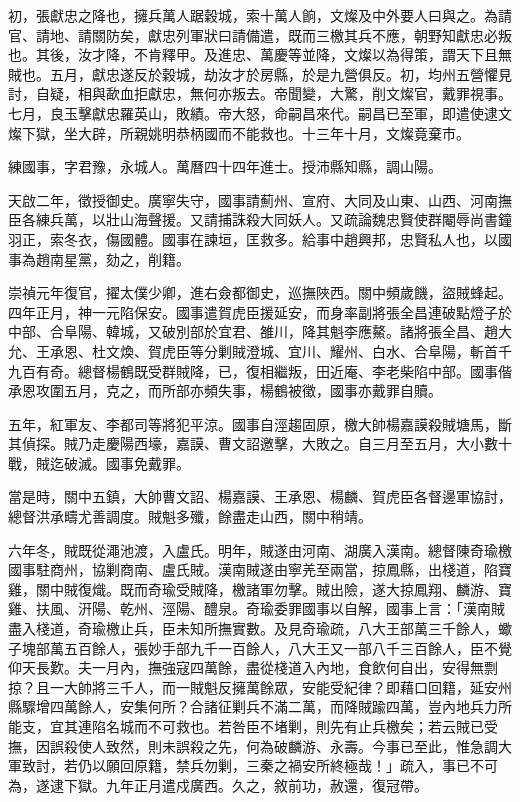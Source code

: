 \begin{pinyinscope}
初，張獻忠之降也，擁兵萬人踞穀城，索十萬人餉，文燦及中外要人曰與之。為請官、請地、請關防矣，獻忠列軍狀曰請備遣，既而三檄其兵不應，朝野知獻忠必叛也。其後，汝才降，不肯釋甲。及進忠、萬慶等並降，文燦以為得策，謂天下且無賊也。五月，獻忠遂反於穀城，劫汝才於房縣，於是九營俱反。初，均州五營懼見討，自疑，相與歃血拒獻忠，無何亦叛去。帝聞變，大驚，削文燦官，戴罪視事。七月，良玉擊獻忠羅英山，敗績。帝大怒，命嗣昌來代。嗣昌已至軍，即遣使逮文燦下獄，坐大辟，所親姚明恭柄國而不能救也。十三年十月，文燦竟棄市。

練國事，字君豫，永城人。萬曆四十四年進士。授沛縣知縣，調山陽。

天啟二年，徵授御史。廣寧失守，國事請薊州、宣府、大同及山東、山西、河南撫臣各練兵萬，以壯山海聲援。又請捕誅殺大同妖人。又疏論魏忠賢使群閹辱尚書鐘羽正，索冬衣，傷國體。國事在諫垣，匡救多。給事中趙興邦，忠賢私人也，以國事為趙南星黨，劾之，削籍。

崇禎元年復官，擢太僕少卿，進右僉都御史，巡撫陜西。關中頻歲饑，盜賊蜂起。四年正月，神一元陷保安。國事遣賀虎臣援延安，而身率副將張全昌連破點燈子於中部、合阜陽、韓城，又破別部於宜君、雒川，降其魁李應鰲。諸將張全昌、趙大允、王承恩、杜文煥、賀虎臣等分剿賊澄城、宜川、耀州、白水、合阜陽，斬首千九百有奇。總督楊鶴既受群賊降，已，復相繼叛，田近庵、李老柴陷中部。國事偕承恩攻圍五月，克之，而所部亦頻失事，楊鶴被徵，國事亦戴罪自贖。

五年，紅軍友、李都司等將犯平涼。國事自涇趨固原，檄大帥楊嘉謨殺賊塘馬，斷其偵探。賊乃走慶陽西壕，嘉謨、曹文詔邀擊，大敗之。自三月至五月，大小數十戰，賊迄破滅。國事免戴罪。

當是時，關中五鎮，大帥曹文詔、楊嘉謨、王承恩、楊麟、賀虎臣各督邊軍協討，總督洪承疇尤善調度。賊魁多殲，餘盡走山西，關中稍靖。

六年冬，賊既從澠池渡，入盧氏。明年，賊遂由河南、湖廣入漢南。總督陳奇瑜檄國事駐商州，協剿商南、盧氏賊。漢南賊遂由寧羌至兩當，掠鳳縣，出棧道，陷寶雞，關中賊復熾。既而奇瑜受賊降，檄諸軍勿擊。賊出險，遂大掠鳳翔、麟游、寶雞、扶風、汧陽、乾州、涇陽、醴泉。奇瑜委罪國事以自解，國事上言：「漢南賊盡入棧道，奇瑜檄止兵，臣未知所撫實數。及見奇瑜疏，八大王部萬三千餘人，蠍子塊部萬五百餘人，張妙手部九千一百餘人，八大王又一部八千三百餘人，臣不覺仰天長歎。夫一月內，撫強寇四萬餘，盡從棧道入內地，食飲何自出，安得無剽掠？且一大帥將三千人，而一賊魁反擁萬餘眾，安能受紀律？即藉口回籍，延安州縣驟增四萬餘人，安集何所？合諸征剿兵不滿二萬，而降賊踰四萬，豈內地兵力所能支，宜其連陷名城而不可救也。若咎臣不堵剿，則先有止兵檄矣；若云賊已受撫，因誤殺使人致然，則未誤殺之先，何為破麟游、永壽。今事已至此，惟急調大軍致討，若仍以願回原籍，禁兵勿剿，三秦之禍安所終極哉！」疏入，事已不可為，遂逮下獄。九年正月遣戍廣西。久之，敘前功，赦還，復冠帶。


\end{pinyinscope}

